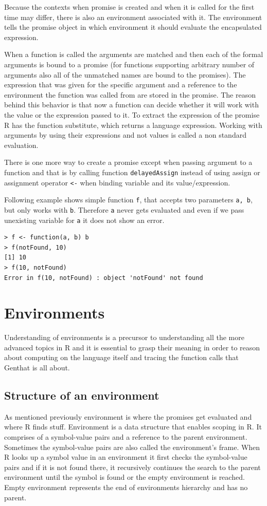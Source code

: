 \documentclass[thesis=B,english]{FITthesis}[2012/10/20]
\begin{document}
Because the contexts when promise is created and when it is called for the first time may differ, there is also an environment associated with it. The environment tells the promise object in which environment it should evaluate the encapsulated expression.

When a function is called the arguments are matched and then each of the formal arguments is bound to a promise (for functions supporting arbitrary number of arguments also all of the unmatched names are bound to the promises). The expression that was given for the specific argument and a reference to the environment the function was called from are stored in the promise. \cite{specs} The reason behind this behavior is that now a function can decide whether it will work with the value or the expression passed to it. To extract the expression of the promise R has the function substitute, which returns a language expression. Working with arguments by using their expressions and not values is called a non standard evaluation.

There is one more way to create a promise except when passing argument to a function and that is by calling function \verb|delayedAssign| instead of using assign or assignment operator \verb|<-| when binding variable and its value/expression.

Following example shows simple function \verb|f|, that accepts two parameters \verb|a, b|, but only works with \verb|b|. Therefore \verb|a| never gets evaluated and even if we pass unexisting variable for \verb|a| it does not show an error.

\begin{verbatim}
> f <- function(a, b) b
> f(notFound, 10)
[1] 10
> f(10, notFound)
Error in f(10, notFound) : object 'notFound' not found
\end{verbatim}

\section{Environments}
Understanding of environments is a precursor to understanding all the more advanced topics in R and it is essential to grasp their meaning in order to reason about computing on the language itself and tracing the function calls that Genthat is all about.

\subsection{Structure of an environment}
As mentioned previously environment is where the promises get evaluated and where R finds stuff. Environment is a data structure that enables scoping in R. It comprises of a symbol-value pairs and a reference to the parent environment. Sometimes the symbol-value pairs are also called the environment’s frame. When R looks up a symbol value in an environment it first checks the symbol-value pairs and if it is not found there, it recursively continues the search to the parent environment until the symbol is found or the empty environment is reached. Empty environment represents the end of environments hierarchy and has no parent.
\end{document}
